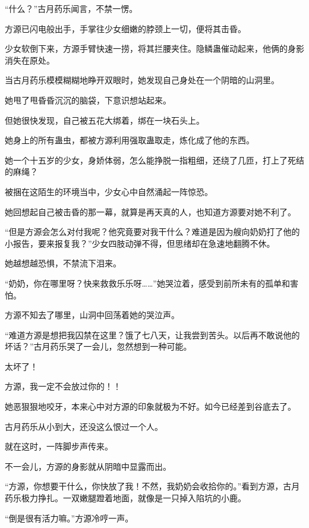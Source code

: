 
\begin{this_body}



“什么？”古月药乐闻言，不禁一愣。

方源已闪电般出手，手掌往少女细嫩的脖颈上一切，便将其击昏。

少女软倒下来，方源手臂快速一捞，将其拦腰夹住。隐鳞蛊催动起来，他俩的身影消失在原处。

当古月药乐模模糊糊地睁开双眼时，她发现自己身处在一个阴暗的山洞里。

她甩了甩昏昏沉沉的脑袋，下意识想站起来。

但她很快发现，自己被五花大绑着，绑在一块石头上。

她身上的所有蛊虫，都被方源利用强取蛊取走，炼化成了他的东西。

她一个十五岁的少女，身娇体弱，怎么能挣脱一指粗细，还绕了几匝，打上了死结的麻绳？

被捆在这陌生的环境当中，少女心中自然涌起一阵惊恐。

她回想起自己被击昏的那一幕，就算是再天真的人，也知道方源要对她不利了。

“但是方源会怎么对付我呢？他究竟要对我干什么？难道是因为艘向奶奶打了他的小报告，要来报复我？”少女四肢动弹不得，但思绪却在急速地翻腾不休。

她越想越恐惧，不禁流下泪来。

“奶奶，你在哪里呀？快来救救乐乐呀……”她哭泣着，感受到前所未有的孤单和害怕。

方源不知去了哪里，山洞中回荡着她的哭泣声。

“难道方源是想把我囚禁在这里？饿了七八天，让我尝到苦头。以后再不敢说他的坏话？”古月药乐哭了一会儿，忽然想到一种可能。

太坏了！

方源，我一定不会放过你的！！

她恶狠狠地咬牙，本来心中对方源的印象就极为不好。如今已经差到谷底去了。

古月药乐从小到大，还没这么恨过一个人。

就在这时，一阵脚步声传来。

不一会儿，方源的身影就从阴暗中显露而出。

“方源，你想要干什么，你快放了我！不然，我奶奶会收拾你的。”看到方源，古月药乐极力挣扎。一双嫩腿蹬着地面，就像是一只掉入陷坑的小鹿。

“倒是很有活力嘛。”方源冷哼一声。


\end{this_body}
